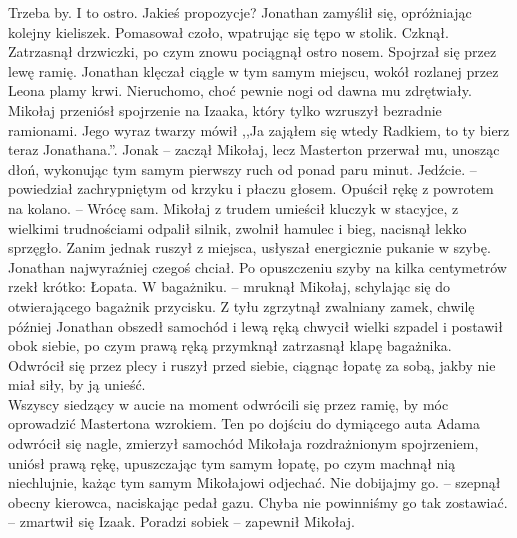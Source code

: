 \documentclass[../MAIN.tex]{subfiles}
\begin{document}
\xx Trzeba by. I to ostro. Jakieś propozycje?
\qd
Jonathan zamyślił się, opróżniając kolejny kieliszek. Pomasował czoło, wpatrując się tępo w stolik. Czknął.
%
%
Zatrzasnął drzwiczki, po czym znowu pociągnął ostro nosem. Spojrzał się przez lewę ramię. Jonathan klęczał ciągle w tym samym miejscu, wokół rozlanej przez Leona plamy krwi. Nieruchomo, choć pewnie nogi od dawna mu zdrętwiały. Mikołaj przeniósł spojrzenie na Izaaka, który tylko wzruszył bezradnie ramionami. Jego wyraz twarzy mówił ,,Ja zająłem się wtedy Radkiem, to ty bierz teraz Jonathana.''.
\sx Jona\3k -- zaczął Mikołaj, lecz Masterton przerwał mu, unosząc dłoń, wykonując tym samym pierwszy ruch od ponad paru minut.
\xx Jedźcie. -- powiedział zachrypniętym od krzyku i płaczu głosem. Opuścił rękę z powrotem na kolano. -- Wrócę sam.
\qd
Mikołaj z trudem umieścił kluczyk w stacyjce, z wielkimi trudnościami odpalił silnik, zwolnił hamulec i bieg, nacisnął lekko sprzęgło. Zanim jednak ruszył z miejsca, usłyszał energicznie pukanie w szybę. Jonathan najwyraźniej czegoś chciał. Po opuszczeniu szyby na kilka centymetrów rzekł krótko:
\sx Łopata.
\xx W bagażniku. -- mruknął Mikołaj, schylając się do otwierającego bagażnik przycisku.
\qd
Z tyłu zgrzytnął zwalniany zamek, chwilę później Jonathan obszedł samochód i lewą ręką chwycił wielki szpadel i postawił obok siebie, po czym prawą ręką przymknął zatrzasnął klapę bagażnika. Odwrócił się przez plecy i ruszył przed siebie, ciągnąc łopatę za sobą, jakby nie miał siły, by ją unieść.\\
Wszyscy siedzący w aucie na moment odwrócili się przez ramię, by móc oprowadzić Mastertona wzrokiem. Ten po dojściu do dymiącego auta Adama odwrócił się nagle, zmierzył samochód Mikołaja rozdrażnionym spojrzeniem, uniósł prawą rękę, upuszczając tym samym łopatę, po czym machnął nią niechlujnie, każąc tym samym Mikołajowi odjechać.
\sx Nie dobijajmy go. -- szepnął obecny kierowca, naciskając pedał gazu.
\xx Chyba nie powinniśmy go tak zostawiać. -- zmartwił się Izaak.
\xx Poradzi sobie\3k -- zapewnił Mikołaj.
\qd
\end{document}
